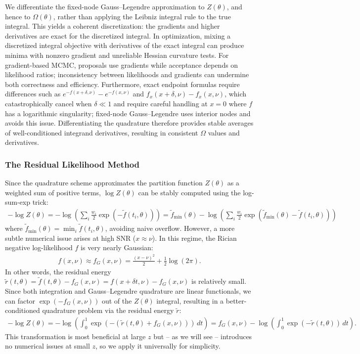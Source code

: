 \documentclass{article}
\begin{document}
We differentiate the fixed-node Gauss--Legendre approximation to $Z(\theta)$, and hence to $\Omega(\theta)$, rather than applying the Leibniz integral rule to the true integral.
This yields a coherent discretization: the gradients and higher derivatives are exact for the discretized integral.
In optimization, mixing a discretized integral objective with derivatives of the exact integral can produce minima with nonzero gradient and unreliable Hessian curvature tests.
For gradient-based MCMC, proposals use gradients while acceptance depends on likelihood ratios; inconsistency between likelihoods and gradients can undermine both correctness and efficiency.
Furthermore, exact endpoint formulas require differences such as $e^{-f(x+\delta,\nu)} - e^{-f(x,\nu)}$ and $f_x(x+\delta,\nu) - f_x(x,\nu)$, which catastrophically cancel when $\delta \ll 1$ and require careful handling at $x=0$ where $f$ has a logarithmic singularity; fixed-node Gauss--Legendre uses interior nodes and avoids this issue.
Differentiating the quadrature therefore provides stable averages of well-conditioned integrand derivatives, resulting in consistent $\Omega$ values and derivatives.

\subsubsection{The Residual Likelihood Method}

Since the quadrature scheme approximates the partition function $Z(\theta)$ as a weighted sum of positive terms, $\log Z(\theta)$ can be stably computed using the log-sum-exp trick:
%
\begin{align}
  -\log Z(\theta)
  = -\log\left(\sum_i \frac{w_i}{2} \exp(-\tilde{f}(t_i, \theta))\right)
  = \tilde{f}_{\min}(\theta) - \log\left(\sum_i \frac{w_i}{2} \exp(\tilde{f}_{\min}(\theta) - \tilde{f}(t_i, \theta))\right)
\end{align}
%
where $\tilde{f}_{\min}(\theta) = \min_i \tilde{f}(t_i, \theta)$, avoiding naive overflow.
However, a more subtle numerical issue arises at high SNR ($x \approx \nu$).
In this regime, the Rician negative log-likelihood $f$ is very nearly Gaussian:
%
\begin{align}
  f(x, \nu) \approx f_G(x,\nu) = \frac{(x-\nu)^2}{2} + \frac{1}{2}\log(2\pi).
\end{align}
%
In other words, the residual energy $\tilde{r}(t,\theta) = \tilde{f}(t,\theta) - f_G(x,\nu) = f(x + \delta t, \nu) - f_G(x,\nu)$ is relatively small.
Since both integration and Gauss--Legendre quadrature are linear functionals, we can factor $\exp(-f_G(x,\nu))$ out of the $Z(\theta)$ integral, resulting in a better-conditioned quadrature problem via the residual energy $\tilde{r}$:
%
\begin{align}
  -\log Z(\theta)
  = - \log\left(\int_0^1 \exp(-(\tilde{r}(t,\theta) + f_G(x,\nu))) \, dt \right)
  = f_G(x,\nu) - \log\left(\int_0^1 \exp(-\tilde{r}(t,\theta)) \, dt \right). \label{eq:logz-residual-derivation}
\end{align}
%
This transformation is most beneficial at large $z$ but -- as we will see -- introduces no numerical issues at small $z$, so we apply it universally for simplicity.
\end{document}
